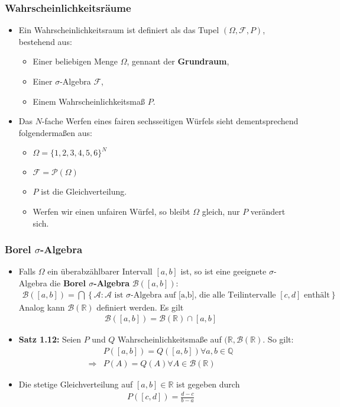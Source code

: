 \documentclass{scrartcl}
\newcommand{\mc}[1]{\mathcal{#1}}
\begin{document}
\subsubsection*{Wahrscheinlichkeitsräume}
\begin{itemize}
    \item Ein Wahrscheinlichkeitsraum ist definiert als das Tupel $(\Omega, \mc{F}, P)$, bestehend aus:
    \begin{itemize}
        \item Einer beliebigen Menge $\Omega$, gennant der \textbf{Grundraum},
        \item Einer $\sigma$-Algebra $\mc{F}$,
        \item Einem Wahrscheinlichkeitsmaß $P$.
    \end{itemize}
    \item Das $N$-fache Werfen eines fairen sechsseitigen Würfels sieht dementsprechend folgendermaßen aus:
    \begin{itemize}
        \item $\Omega = \{1,2,3,4,5,6\}^N$
        \item $\mc{F} = \mc{P}(\Omega)$
        \item $P$ ist die Gleichverteilung.
        \item Werfen wir einen unfairen Würfel, so bleibt $\Omega$ gleich, nur $P$ verändert sich.
    \end{itemize}
\end{itemize}
\subsubsection*{Borel $\sigma$-Algebra}
\begin{itemize}
    \item Falls $\Omega$ ein überabzählbarer Intervall $[a,b]$ ist, so ist eine geeignete $\sigma$-Algebra die \textbf{Borel $\sigma$-Algebra} $\mc{B}([a,b])$:
    \begin{align*}
        \mc{B}([a,b]) = \bigcap \left\{\mc{A}: \mc{A} \text{ ist $\sigma$-Algebra auf $$[a,b]$$, die alle Teilintervalle $[c,d]$ enthält}\right\}
    \end{align*}
    Analog kann $\mc{B}(\mathbb{R})$ definiert werden. Es gilt
    \begin{align*}
        \mc{B}([a,b]) = \mc{B}(\mathbb{R}) \cap [a,b]
    \end{align*}
    \item \textbf{Satz 1.12:} Seien $P$ und $Q$ Wahrscheinlichkeitsmaße auf $(\mathbb{R},\mc{B}(\mathbb{R})$. So gilt:
    \begin{align*}
        &P([a,b]) = Q([a,b]) \forall a,b \in \mathbb{Q}\\
        \Longrightarrow{} &P(A) = Q(A) \forall A \in \mc{B}(\mathbb{R})
    \end{align*}
    \item Die stetige Gleichverteilung auf $[a,b] \in \mathbb{R}$ ist gegeben durch
    \begin{align*}
        P([c,d]) = \frac{d-c}{b-a}
    \end{align*}
\end{itemize}
\end{document}
